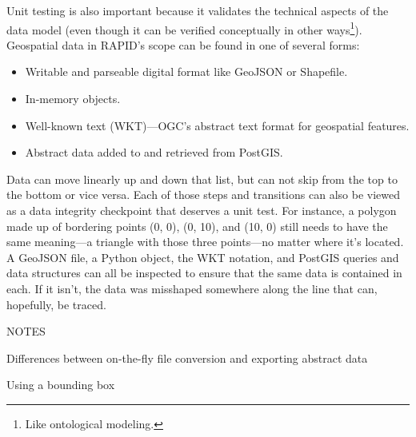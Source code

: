 Unit testing is also important because it validates the technical aspects of the data model (even though it can be verified conceptually in other ways\footnote{Like ontological modeling.}). Geospatial data in RAPID's scope can be found in one of several forms:

\begin{itemize}
\item Writable and parseable digital format like GeoJSON or Shapefile.
\item In-memory objects.
\item Well-known text (WKT)---OGC's abstract text format for geospatial features.
\item Abstract data added to and retrieved from PostGIS.
\end{itemize}

Data can move linearly up and down that list, but can not skip from the top to the bottom or vice versa. Each of those steps and transitions can also be viewed as a data integrity checkpoint that deserves a unit test. For instance, a polygon made up of bordering points (0, 0), (0, 10), and (10, 0) still needs to have the same meaning---a triangle with those three points---no matter where it's located. A GeoJSON file, a Python object, the WKT notation, and PostGIS queries and data structures can all be inspected to ensure that the same data is contained in each. If it isn't, the data was misshaped somewhere along the line that can, hopefully, be traced.



NOTES

Differences between on-the-fly file conversion and exporting abstract data

Using a bounding box